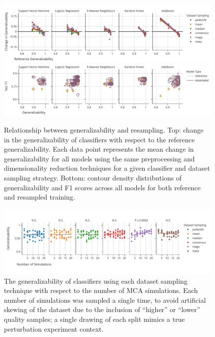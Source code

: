 \documentclass[10pt]{SelfArx} %
\begin{document}
\begin{figure}[bht!]\centering
\includegraphics[width=\linewidth]{figures/2a.pdf}
\includegraphics[width=\linewidth]{figures/2b.pdf}
\caption{Relationship between generalizability and resampling. Top: change in the generalizability of classifiers with
respect to the reference generalizability. Each data point represents the mean change in generalizability for all
models using the same preprocessing and dimensionality reduction techniques for a given classifier and dataset sampling
strategy. Bottom: contour density distributions of generalizability and F1 scores across all models for both reference
and resampled training.
}
\label{fig:change_in_gen}
\end{figure}

\begin{figure}[ht]\centering
\includegraphics[width=\linewidth]{figures/3.pdf}
\caption{The generalizability of classifiers using each dataset sampling technique with respect to the number of MCA
simulations. Each number of simulations was sampled a single time, to avoid artificial skewing of the dataset due to
the inclusion of ``higher'' or ``lower'' quality samples; a single drawing of each split mimics a true perturbation
experiment context.}
\label{fig:nmca}
\end{figure}
\end{document}

